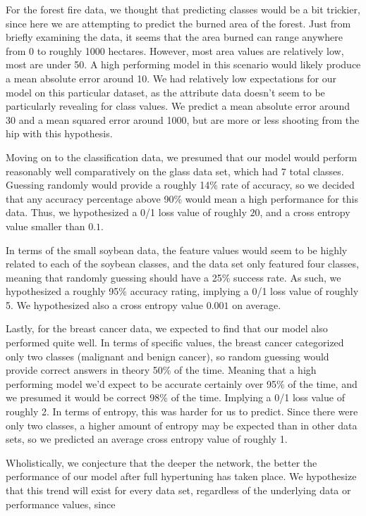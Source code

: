 \documentclass[twoside,11pt]{article}
\begin{document}
  For the forest fire data, we thought that predicting classes would be a bit trickier, since here we are attempting to predict the burned area of the forest.
  Just from briefly examining the data, it seems that the area burned can range anywhere from 0 to roughly 1000 hectares. However, most area values are relatively low,
  most are under 50. A high performing model in this scenario would likely produce a mean absolute error around 10. We had relatively low expectations for our model on
  this particular dataset, as the attribute data doesn't seem to be particularly revealing for class values. We predict a mean absolute error around 30 and a mean squared
  error around 1000, but are more or less shooting from the hip with this hypothesis. 

  Moving on to the classification data, we presumed that our model would perform reasonably well comparatively on the glass data set, which had 7 total classes. Guessing
  randomly would provide a roughly 14\% rate of accuracy, so we decided that any accuracy percentage above 90\% would mean a high performance for this data. Thus, we 
  hypothesized a 0/1 loss value of roughly $20$, and a cross entropy value smaller than $0.1$. 

  In terms of the small soybean data, the feature values would seem to be highly related to each of the soybean classes, and the data set only featured four classes,
  meaning that randomly guessing should have a 25\% success rate. As such, we hypothesized a roughly 95\% accuracy rating, implying a 0/1 loss value of roughly
  5. We hypothesized also a cross entropy value $0.001$ on average.

  Lastly, for the breast cancer data, we expected to find that our model also performed quite well. In terms of specific values, the breast cancer categorized
  only two classes (malignant and benign cancer), so random guessing would provide correct answers in theory 50\% of the time. Meaning that a high performing model
  we'd expect to be accurate certainly over 95\% of the time, and we presumed it would be correct 98\% of the time. Implying a 0/1 loss value of roughly 2. In terms of
  entropy, this was harder for us to predict. Since there were only two classes, a higher amount of entropy may be expected than in other data sets, so we predicted
  an average cross entropy value of roughly 1.

  Wholistically, we conjecture that the deeper the network, the better the performance of our model after full hypertuning has taken place. We hypothesize that
  this trend will exist for every data set, regardless of the underlying data or performance values, since 
\end{document}
